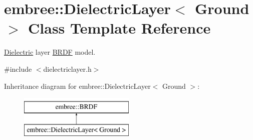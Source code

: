 \hypertarget{classembree_1_1_dielectric_layer}{
\section{embree::DielectricLayer$<$ Ground $>$ Class Template Reference}
\label{classembree_1_1_dielectric_layer}
}


\hyperlink{classembree_1_1_dielectric}{Dielectric} layer \hyperlink{classembree_1_1_b_r_d_f}{BRDF} model.  




{\ttfamily \#include $<$dielectriclayer.h$>$}

Inheritance diagram for embree::DielectricLayer$<$ Ground $>$:\begin{figure}[H]
\begin{center}
\leavevmode
\includegraphics[height=2.000000cm]{classembree_1_1_dielectric_layer}
\end{center}
\end{figure}
